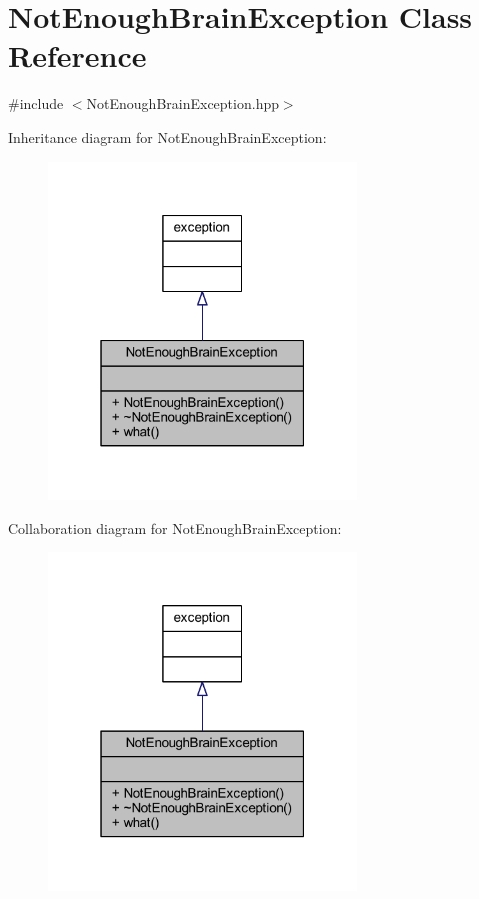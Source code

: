 \hypertarget{class_not_enough_brain_exception}{}\section{Not\+Enough\+Brain\+Exception Class Reference}
\label{class_not_enough_brain_exception}


{\ttfamily \#include $<$Not\+Enough\+Brain\+Exception.\+hpp$>$}



Inheritance diagram for Not\+Enough\+Brain\+Exception\+:\nopagebreak
\begin{figure}[H]
\begin{center}
\leavevmode
\includegraphics[width=232pt]{class_not_enough_brain_exception__inherit__graph}
\end{center}
\end{figure}


Collaboration diagram for Not\+Enough\+Brain\+Exception\+:\nopagebreak
\begin{figure}[H]
\begin{center}
\leavevmode
\includegraphics[width=232pt]{class_not_enough_brain_exception__coll__graph}
\end{center}
\end{figure}
